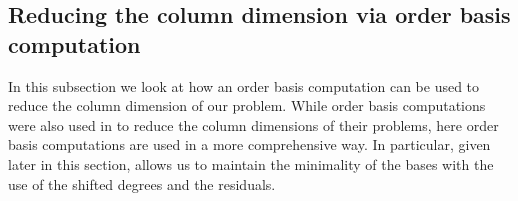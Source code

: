 \subsection{\label{sub:continueComputingNullspaceBasisByColumns}Reducing the
column dimension via order basis computation}

In this subsection we look at how an order basis computation can be
used to reduce the column dimension of our problem. While order basis
computations were also used in \citep{storjohann-villard:2005} to
reduce the column dimensions of their problems, here order basis computations
are used in a more comprehensive way. In particular, 
given later in this section, allows us to maintain the minimality
of the bases with the use of the shifted degrees and the residuals.

